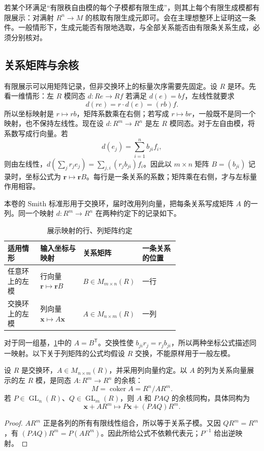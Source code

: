 \ProseParagraphBreak
若某个环满足“有限秩自由模的每个子模都有限生成”，则其上每个有限生成模都有限展示：对满射 \(R^n\to M\) 的核取有限生成元即可。会在主理想整环上证明这一条件。一般情形下，生成元能否有限地选取，与全部关系能否由有限条关系生成，必须分别核对。

\subsection{关系矩阵与余核}
\label{b2:subsec:0302:03}

有限展示可以用矩阵记录，但非交换环上的标量次序需要先固定。设 \(R\) 是环。先看一维情形：左 \(R\) 模同态 \(d:Re\to Rf\) 若满足 \(d(e)=bf\)，左线性就要求
\[
	d(re)=r\cdot d(e)=(rb)f.
\]
所以坐标映射是 \(r\mapsto rb\)，矩阵系数乘在右侧；若写成 \(r\mapsto br\)，一般既不是同一个映射，也不保持左线性。现在设 \(d:R^m\to R^n\) 是左 \(R\) 模同态。对于左自由模，将系数写成行向量。若
\[
	d(e_j)=\sum_{i=1}^n b_{ji}f_i,
\]
则由左线性，\(d(\sum_j r_je_j)=\sum_{j,i}(r_jb_{ji})f_i\)。因此以 \(m\times n\) 矩阵 \(B=(b_{ji})\) 记录时，坐标公式为 \(\mathbf r\mapsto\mathbf r B\)。每行是一条关系的系数；矩阵乘在右侧，才与左标量作用相容。

\ProseParagraphBreak
本卷的 Smith 标准形用于交换环，届时改用列向量，把每条关系写成矩阵 \(A\) 的一列。同一个映射 \(d:R^m\to R^n\) 在两种约定下的记录如下。

\begin{table}[htbp]
	\centering
	\caption{展示映射的行、列矩阵约定}\label{b2:tab:presentation-matrix-conventions}
	\begin{tabularx}{\linewidth}{@{}p{0.19\linewidth}p{0.25\linewidth}p{0.23\linewidth}X@{}}
		\toprule
		适用情形 & 输入坐标与映射 & 关系矩阵 & 一条关系的位置 \\
		\midrule
		任意环上的左模 & 行向量 \(\mathbf r\mapsto\mathbf r B\) & \(B\in M_{m\times n}(R)\) & 一行 \\
		交换环上的左模 & 列向量 \(\mathbf x\mapsto A\mathbf x\) & \(A\in M_{n\times m}(R)\) & 一列 \\
		\bottomrule
	\end{tabularx}
\end{table}
对于同一组基，\cref{b2:tab:presentation-matrix-conventions}中的 \(A=B^{\mathsf T}\)。交换性使 \(b_{ji}r_j=r_jb_{ji}\)，所以两种坐标公式描述同一映射。以下关于列矩阵的公式均假设 \(R\) 交换，不能原样用于一般左模。

\begin{proposition}\label{b2:prop:presentation-matrix}
	设 \(R\) 是交换环，\(A\in M_{n\times m}(R)\)，并采用列向量约定。以 \(A\) 的列为关系向量展示的左 \(R\) 模，是同态 \(A:R^m\to R^n\) 的余核：
	\[
		M=\operatorname{coker}A=R^n/AR^m.
	\]
	若 \(P\in\operatorname{GL}_n(R)\)、\(Q\in\operatorname{GL}_m(R)\)，则 \(A\) 和 \(PAQ\) 的余核同构，具体同构为
	\[
		\mathbf x+AR^m\longmapsto P\mathbf x+(PAQ)R^m.
	\]
\end{proposition}
\begin{proof}
	\(AR^m\) 正是各列的所有有限线性组合，所以等于关系子模。又因 \(QR^m=R^m\)，有 \((PAQ)R^m=P(AR^m)\)。因此所给公式不依赖代表元；\(P^{-1}\) 给出逆映射。
\end{proof}

